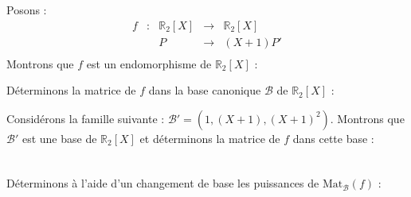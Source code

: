 \documentclass[a4paper,10pt]{report}
\begin{document}
\begin{Exemple} Posons :
$$ \begin{array}{ccccl}
f & : & \mathbb{R}_2[X] & \rightarrow & \mathbb{R}_2[X] \\
& & P & \rightarrow & (X+1)P' \\
\end{array} $$
Montrons que $f$ est un endomorphisme de $ \mathbb{R}_2[X]$ :

\vspace{3cm}


Déterminons la matrice de $f$ dans la base canonique $\mathcal{B}$ de $\mathbb{R}_2[X]$ :

\vspace{5cm}

Considérons la famille suivante : $\mathcal{B}'= (1, (X+1),(X+1)^2)$. Montrons que $\mathcal{B}'$ est une base de $\mathbb{R}_2[X]$ et déterminons la matrice de $f$ dans cette base :

\newpage
$\phantom{test}$

\vspace{6.5cm}

Déterminons à l'aide d'un changement de base les puissances de $\textrm{Mat}_{\mathcal{B}}(f)$ :


\end{Exemple}
\end{document}
